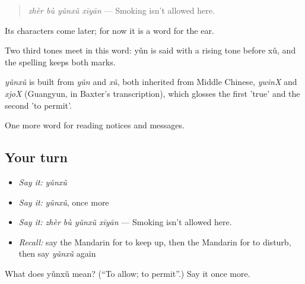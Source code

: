 \begin{quote}
\emph{zhèr bù yǔnxǔ xīyān} — Smoking isn't allowed here.
\end{quote}

Its characters come later; for now it is a word for the ear.

Two third tones meet in this word: yǔn is said with a rising tone before xǔ, and the spelling keeps both marks.

\begin{cousinweb}
\emph{yǔnxǔ} is built from \emph{yǔn} and \emph{xǔ}, both inherited from Middle Chinese, \emph{ywinX} and \emph{xjoX} (Guangyun, in Baxter's transcription), which glosses the first 'true' and the second 'to permit'.
\end{cousinweb}

\begin{grammarlens}[title={What you've built}]
One more word for reading notices and messages.
\end{grammarlens}

\subsection*{Your turn}
\begin{itemize}
\raggedright
  \item \emph{Say it:} \emph{yǔnxǔ}
  \item \emph{Say it:} \emph{yǔnxǔ}, once more
  \item \emph{Say it:} \emph{zhèr bù yǔnxǔ xīyān} — Smoking isn't allowed here.
  \item \emph{Recall:} say the Mandarin for to keep up, then the Mandarin for to disturb, then say \emph{yǔnxǔ} again
\end{itemize}

\begin{tcolorbox}[breakable,colback=teal!4,colframe=teal!35!black,title={Before you move on}]
What does yǔnxǔ mean? (\textquotedblleft{}To allow; to permit\textquotedblright{}.) Say it once more.
\end{tcolorbox}
